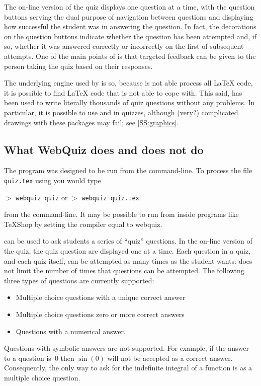 \documentclass[svgnames]{article}
\begin{document}

    The on-line version of the quiz displays one question at a time,
    with the question buttons serving the dual purpose of navigation
    between questions and displaying how successful the student was
    in answering the question. In fact, the decorations on the question
    buttons indicate whether the question has been attempted and, if so,
    whether it was answered correctly or incorrectly on the first of
    subsequent attempts. One of the main points of \WebQuiz is that
    targeted feedback can be given to the person taking the quiz based
    on their responses.

    The underlying engine used by \WebQuiz is  so, because
     is not able process all \LaTeX{} code, it is possible to
    find \LaTeX{} code that \WebQuiz is not able to cope with.
    This said, \WebQuiz has been used to write literally thousands of quiz
    questions without any problems. In particular, it is possible to use
     and  in \WebQuiz quizzes, although
    (very?) complicated drawings with these packages may fail; see
    \autoref{SS:graphics}.

\subsection{What WebQuiz does and does not do}

    The \WebQuiz program was designed to be run from the command-line.
    To process the file \texttt{quiz.tex} using \WebQuiz you would
    type

    $>$ \Verb|webquiz quiz| \qquad or \qquad $>$ \Verb|webquiz quiz.tex|

    \noindent from the command-line. It may be possible to run \WebQuiz
    from inside programs like \TeX Shop by setting the compiler equal to
    \textsf{webquiz}.

    \WebQuiz can be used to ask students a series of ``quiz'' questions. In
    the on-line version of the quiz, the quiz question are displayed one
    at a time. Each question in a quiz, and each quiz itself, can be
    attempted as many times as the student wants: \WebQuiz does not
    limit the number of times that questions can be attempted.
    The following three types of questions are currently supported:
    \begin{itemize}
      \item Multiple choice questions with a unique correct answer
      \item Multiple choice questions zero or more correct answers
      \item Questions with a numerical answer.
    \end{itemize}
    Questions with symbolic answers are not supported.  For example, if
    the answer to a question is~$0$ then $\sin(0)$ will not be accepted
    as a correct answer. Consequently, the only way to ask for the
    indefinite integral of a function is as a multiple choice question.
\end{document}
